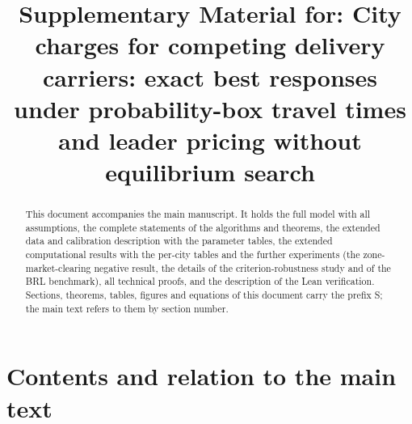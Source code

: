 \documentclass[preprint,11pt]{elsarticle}
\theoremstyle{definition}
\theoremstyle{remark}
\begin{document}
\begin{frontmatter}
\date{}

\title{Supplementary Material for: City charges for competing delivery carriers: exact best responses under probability-box travel times and leader pricing without equilibrium search}

\begin{abstract}
This document accompanies the main manuscript. It holds the full model with all assumptions, the complete statements of the algorithms and theorems, the extended data and calibration description with the parameter tables, the extended computational results with the per-city tables and the further experiments (the zone-market-clearing negative result, the details of the criterion-robustness study and of the BRL benchmark), all technical proofs, and the description of the Lean verification. Sections, theorems, tables, figures and equations of this document carry the prefix S; the main text refers to them by section number.
\end{abstract}

\end{frontmatter}

\section*{Contents and relation to the main text}
\end{document}
